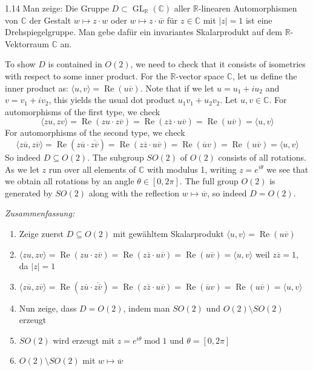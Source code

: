 \begin{exercise}{1.1}{4}
    Man zeige: Die Gruppe $D \subset \operatorname{GL}_{\mathbb R}(\mathbb C)$ aller $\mathbb R$-linearen Automorphismen von $\mathbb C$ der Gestalt $w \mapsto z \cdot w$ oder $w \mapsto z \cdot \overline{w}$ für $z \in \mathbb C$ mit $|z| = 1$
    ist eine Drehspiegelgruppe. Man gebe dafür ein invariantes Skalarprodukt auf
    dem $\mathbb R$-Vektorraum $\mathbb C$ an.
\end{exercise}
\noindent
To show $D$ is contained in $O(2)$, we need to check that it consists
of isometries with respect to some inner product. For the $\mathbb R$-vector space $\mathbb C$,
let us define the inner product as: $\langle u, v \rangle = \operatorname{Re}(u\overline{v})$.
Note that if we let $u = u_1 + iu_2$ and $v = v_1 + iv_2$, this yields the usual dot
product $u_1v_1 + u_2v_2$.
Let $u, v \in \mathbb C$. For automorphisms of the first type, we check
\[
    \langle zu, zv \rangle = \operatorname{Re}(zu \cdot z\overline{v}) = \operatorname{Re}(z\overline{z} \cdot u\overline{v}) = \operatorname{Re}(u\overline{v}) = \langle u, v\rangle
\]
For automorphisms of the second type, we check
\[
    \langle z\overline{u}, z\overline{v} \rangle = \operatorname{Re}(z\overline{u} \cdot \overline{z\overline{v}}) = \operatorname{Re}(z\overline{z} \cdot u\overline{v}) = \operatorname{Re}(\overline{u}v) = \operatorname{Re}(u\overline{v}) = \langle u, v\rangle
\]
So indeed $D \subseteq O(2)$.
The subgroup $SO(2)$ of $O(2)$ consists of all rotations. As we let $z$ run over
all elements of $\mathbb C$ with modulus 1, writing $z = e^{i\theta}$ we see that we obtain all
rotations by an angle $\theta \in [0, 2\pi]$. The full group $O(2)$ is generated by $SO(2)$
along with the reflection $w \mapsto \overline{w}$, so indeed $D = O(2)$.

\textit{Zusammenfassung:}
\begin{enumerate}
    \item Zeige zuerst $D \subseteq O(2)$ mit gewähltem Skalarprodukt $\langle u, v \rangle = \operatorname{Re}(u\overline{v})$
    \item $\langle zu, zv \rangle = \operatorname{Re}(zu \cdot z\overline{v}) = \operatorname{Re}(z\overline{z} \cdot u\overline{v}) = \operatorname{Re}(u\overline{v}) = \langle u, v\rangle$ weil $z\overline{z} = 1$, da $|z| = 1$
    \item $\langle z\overline{u}, z\overline{v} \rangle = \operatorname{Re}(z\overline{u} \cdot \overline{z\overline{v}}) = \operatorname{Re}(z\overline{z} \cdot u\overline{v}) = \operatorname{Re}(\overline{u}v) = \operatorname{Re}(u\overline{v}) = \langle u, v\rangle$
    \item Nun zeige, dass $D = O(2)$, indem man $SO(2)$ und $O(2)\setminus SO(2)$ erzeugt
    \item $SO(2)$ wird erzeugt mit $z = e^{i\theta} \operatorname{mod} 1$ und $\theta = [0, 2\pi]$
    \item $O(2) \setminus SO(2)$ mit $w \mapsto \overline{w}$
\end{enumerate}

